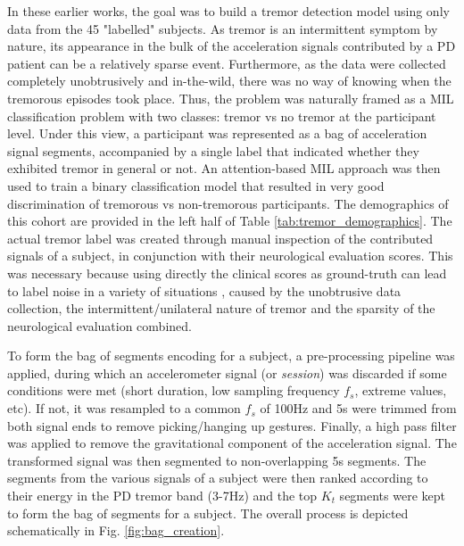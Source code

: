 \documentclass[journal,twoside,web]{ieeecolor}
\begin{document}
In these earlier works, the goal was to build a tremor detection model using only
data from the 45 "labelled" subjects.  As tremor is an intermittent symptom by
nature, its appearance in the bulk of the acceleration signals contributed by a
PD patient can be a relatively sparse event. Furthermore, as the data were
collected completely unobtrusively and in-the-wild, there was no way of knowing
when the tremorous episodes took place. Thus, the problem was naturally framed
as a MIL classification problem with two classes: tremor vs no tremor at the
participant level. Under this view, a participant was represented as a bag of
acceleration signal segments, accompanied by a single label that indicated
whether they exhibited tremor in general or not.  An attention-based MIL
approach was then used to train a binary classification model that resulted in
very good discrimination of tremorous vs non-tremorous participants. The
demographics of this cohort are provided in the left half of Table
\ref{tab:tremor_demographics}. The actual tremor label was created through
manual inspection of the contributed signals of a subject, in conjunction with
their neurological evaluation scores. This was necessary because using directly
the clinical scores as ground-truth can lead to  label noise in a variety of
situations  \cite{alpapado2019tremor}, caused by the unobtrusive data
collection, the intermittent/unilateral nature of tremor and the sparsity of the
neurological evaluation combined. 

To form the bag of segments encoding for a subject, a  pre-processing pipeline
was applied, during which an accelerometer signal (or \emph{session}) was
discarded if some conditions were met (short duration, low sampling frequency
$f_s$, extreme values, etc). If not, it was resampled to a common $f_s$ of 100Hz
and 5s were trimmed from both signal ends to remove picking/hanging up gestures.
Finally, a high pass filter was applied to remove the gravitational component of
the acceleration signal. The transformed signal was then segmented to
non-overlapping 5s segments. The segments from the various signals of a subject
were then ranked according to their energy in the PD tremor band (3-7Hz) and the
top $K_t$ segments were kept to form the bag of segments for a subject. 
The overall process is depicted schematically in Fig. \ref{fig:bag_creation}.
\end{document}

